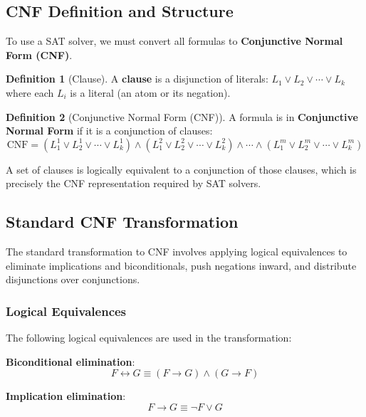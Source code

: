 \documentclass[11pt,a4paper]{article}
\theoremstyle{definition}
\newtheorem{definition}{Definition}[section]
\theoremstyle{plain}
\theoremstyle{remark}
\begin{document}
\subsection{CNF Definition and Structure}

To use a SAT solver, we must convert all formulas to \textbf{Conjunctive Normal Form (CNF)}.

\begin{tcolorbox}[colback=blue!5!white,colframe=blue!75!black,title=\textbf{Conjunctive Normal Form (CNF)}]
\begin{definition}[Clause]
A \textbf{clause} is a disjunction of literals: $L_1 \lor L_2 \lor \cdots \lor L_k$ where each $L_i$ is a literal (an atom or its negation).
\end{definition}

\begin{definition}[Conjunctive Normal Form (CNF)]
A formula is in \textbf{Conjunctive Normal Form} if it is a conjunction of clauses:
\[
\text{CNF} = (L_1^1 \lor L_2^1 \lor \cdots \lor L_k^1) \land (L_1^2 \lor L_2^2 \lor \cdots \lor L_k^2) \land \cdots \land (L_1^m \lor L_2^m \lor \cdots \lor L_k^m)
\]
\end{definition}
\end{tcolorbox}

A set of clauses is logically equivalent to a conjunction of those clauses, which is precisely the CNF representation required by SAT solvers.

\subsection{Standard CNF Transformation}

The standard transformation to CNF involves applying logical equivalences to eliminate implications and biconditionals, push negations inward, and distribute disjunctions over conjunctions.

\subsubsection{Logical Equivalences}

The following logical equivalences are used in the transformation:

\textbf{Biconditional elimination}:
\[
F \leftrightarrow G \equiv (F \rightarrow G) \land (G \rightarrow F)
\]

\textbf{Implication elimination}:
\[
F \rightarrow G \equiv \neg F \lor G
\]
\end{document}
